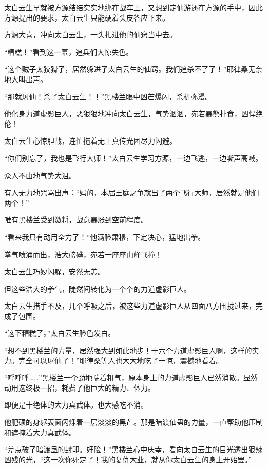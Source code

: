 
\begin{this_body}



太白云生早就被方源结结实实地绑在战车上，又想到定仙游还在方源的手中，因此方源提出的要求，太白云生只能硬着头皮答应下来。

方源大喜，冲向太白云生，一头扎进他的仙窍当中去。

“糟糕！”看到这一幕，追兵们大惊失色。

“这个贼子太狡猾了，居然躲进了太白云生的仙窍。我们追杀不了了！”耶律桑无奈地大叫出声。

“那就屠仙！杀了太白云生！！”黑楼兰眼中凶芒爆闪，杀机弥漫。

他化身力道虚影巨人，恶狠狠地冲向太白云生，气势汹汹，宛若暴熊扑食，凶悍绝伦！

太白云生心惊胆战，连忙拖着无上真传光团尽力闪避。

“你们别忘了，我也是飞行大师！”太白云生学习方源，一边飞逃，一边嘶声高喊。

众人不由地气势大沮。

有人无力地咒骂出声：“妈的，本届王庭之争就出了两个飞行大师，居然就是他们两个！”

唯有黑楼兰受到激将，战意暴涨到空前程度。

“看来我只有动用全力了！”他满脸肃穆，下定决心，猛地出拳。

拳气喷涌而出，浩大磅礴，宛若一座座山峰飞撞！

太白云生巧妙闪躲，安然无恙。

但这些浩大的拳气，陡然间转化为一个个的力道虚影巨人。

太白云生措手不及，几个呼吸之后，被这些力道虚影巨人从四面八方围拢过来，完成了包围。

“这下糟糕了。”太白云生脸色发白。

“想不到黑楼兰的力量，居然强大到如此地步！十六个力道虚影巨人啊，这样的实力。完全可以屠仙了！”耶律桑等人也大大地吃了一惊，震撼地看着。

“呼呼呼……”黑楼兰一个劲地喘着粗气，原本身上的力道虚影巨人已然消散。显然动用这终极一招，耗费了他巨大的精力、体力。

即便是十绝体的大力真武体。也大感吃不消。

他肥硕的身躯表面闪烁着一层淡淡的黑芒。那是暗渡仙蛊的力量，一直帮助他压制和遮掩着大力真武体。

“差点破了暗渡蛊的封印。好险！”黑楼兰心中庆幸，看向太白云生的目光透出狠辣凶残的光，“这一次你死定了！我的复仇大业，就从你太白云生的身上开始罢。”


\end{this_body}
